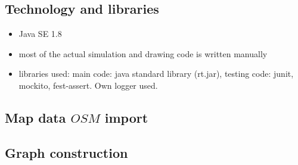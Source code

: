\subsection{Technology and libraries}
\begin{itemize}
    \item Java SE 1.8
    \item most of the actual simulation and drawing code is written manually
    \item libraries used: main code: java standard library (rt.jar), testing code: junit, mockito, fest-assert. Own logger used.
\end{itemize}


\subsection{Map data \(OSM\) import}


\subsection{Graph construction}

